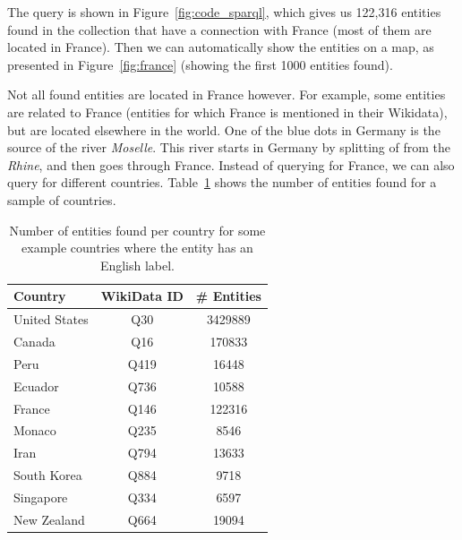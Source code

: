 The query is shown in Figure~\ref{fig:code_sparql}, which gives us 122,316 entities found in the collection that have a connection with France (most of them are located in France). Then we can automatically show the entities on a map, as presented in Figure~\ref{fig:france} (showing the first 1000 entities found). 

Not all found entities are located in France however. For example, some entities are related to France (entities for which France is mentioned in their Wikidata), but are located elsewhere in the world. One of the blue dots in Germany is the source of the river \emph{Moselle}. This river starts in Germany by splitting of from the \emph{Rhine}, and then goes through France. 
Instead of querying for France, we can also query for different countries. Table~\ref{tab:country_entities} shows the number of entities found for a sample of countries.

\begin{table}[]
	\caption{Number of entities found per country for some example countries where the entity has an English label.}
	\label{tab:country_entities}
	\centering
	\begin{tabular}{l|c|c}
		\toprule
		Country & WikiData ID & \# Entities\\
		\midrule
		United States & Q30 & 3429889 \\
		Canada & Q16 & 170833 \\
		Peru & Q419 & 16448 \\
		Ecuador & Q736 & 10588 \\
		France & Q146 & 122316 \\
		Monaco & Q235 & 8546\\
		Iran & Q794 & 13633\\
		South Korea & Q884 & 9718\\
		Singapore & Q334 & 6597\\
		New Zealand & Q664 & 19094\\
		\bottomrule
	\end{tabular}
\end{table}


